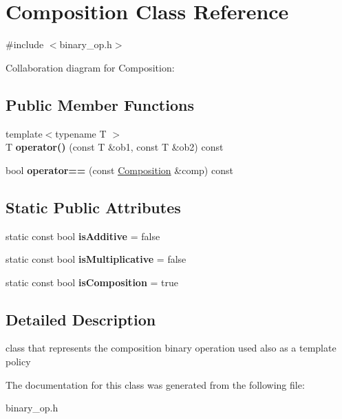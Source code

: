 \hypertarget{classComposition}{\section{Composition Class Reference}
\label{classComposition}
}


{\ttfamily \#include $<$binary\-\_\-op.\-h$>$}



Collaboration diagram for Composition\-:
\subsection*{Public Member Functions}
\begin{DoxyCompactItemize}
\item 
\hypertarget{classComposition_a048fe922128d64e0ac28f59ee3dd6206}{{\footnotesize template$<$typename T $>$ }\\T {\bfseries operator()} (const T \&ob1, const T \&ob2) const }\label{classComposition_a048fe922128d64e0ac28f59ee3dd6206}

\item 
\hypertarget{classComposition_a0c873693a12490e1717a280766eec6c9}{bool {\bfseries operator==} (const \hyperlink{classComposition}{Composition} \&comp) const }\label{classComposition_a0c873693a12490e1717a280766eec6c9}

\end{DoxyCompactItemize}
\subsection*{Static Public Attributes}
\begin{DoxyCompactItemize}
\item 
\hypertarget{classComposition_a3a184cd6b55d3e5cf4f86868d3350c89}{static const bool {\bfseries is\-Additive} = false}\label{classComposition_a3a184cd6b55d3e5cf4f86868d3350c89}

\item 
\hypertarget{classComposition_a4092be14bb95792e50a3670e46455b58}{static const bool {\bfseries is\-Multiplicative} = false}\label{classComposition_a4092be14bb95792e50a3670e46455b58}

\item 
\hypertarget{classComposition_ad088137e0a459dadd3a3c5b89ecdf1d1}{static const bool {\bfseries is\-Composition} = true}\label{classComposition_ad088137e0a459dadd3a3c5b89ecdf1d1}

\end{DoxyCompactItemize}


\subsection{Detailed Description}
class that represents the composition binary operation used also as a template policy 

The documentation for this class was generated from the following file\-:\begin{DoxyCompactItemize}
\item 
binary\-\_\-op.\-h\end{DoxyCompactItemize}
